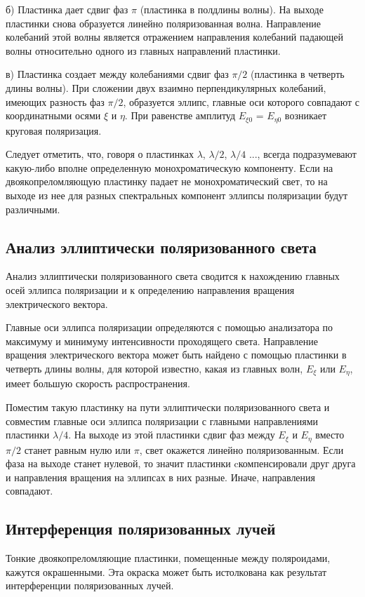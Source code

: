 \documentclass[a4paper,12pt]{article}
\begin{document}
б) Пластинка дает сдвиг фаз $\pi$ (пластинка в полдлины волны). На выходе пластинки снова образуется линейно поляризованная волна. Направление колебаний этой волны является отражением направления колебаний падающей волны относительно одного из главных направлений пластинки.

в) Пластинка создает между колебаниями сдвиг фаз $\pi / 2$ (пластинка в четверть длины волны). При сложении двух взаимно перпендикулярных колебаний, имеющих разность фаз $\pi / 2$, образуется эллипс, главные оси которого совпадают с координатными осями $\xi$ и $\eta$. При равенстве амплитуд $E_{\xi 0}$ = $E_{\eta 0}$ возникает круговая поляризация.

Следует отметить, что, говоря о пластинках $\lambda$, $\lambda / 2$, $\lambda / 4$ ..., всегда подразумевают какую-либо вполне определенную монохроматическую компоненту. Если на двоякопреломляющую пластинку падает не монохроматический свет, то на выходе из нее для разных спектральных компонент эллипсы поляризации будут различными.

\subsection{Анализ эллиптически поляризованного света}
Анализ эллиптически поляризованного света сводится к нахождению главных осей эллипса поляризации и к определению направления вращения электрического вектора.

Главные оси эллипса поляризации определяются с помощью анализатора по максимуму и минимуму интенсивности проходящего света. Направление вращения электрического вектора может быть найдено с помощью пластинки в четверть длины волны, для которой известно, какая из главных волн, $E_\xi$ или $E_\eta$, имеет большую скорость распространения.

Поместим такую пластинку на пути эллиптически поляризованного света и совместим главные оси эллипса поляризации с главными направлениями пластинки $\lambda / 4$. На выходе из этой
пластинки сдвиг фаз между $E_\xi$ и $E_\eta$ вместо $\pi / 2$ станет равным нулю или $\pi$, свет окажется линейно поляризованным. Если фаза на выходе станет нулевой, то значит пластинки cкомпенсировали друг друга и направления вращения на эллипсах в них разные. Иначе, направления совпадают.

\subsection{Интерференция поляризованных лучей}
Тонкие двоякопреломляющие пластинки, помещенные между поляроидами, кажутся окрашенными. Эта окраска может быть истолкована как результат интерференции поляризованных лучей. 
\end{document}
